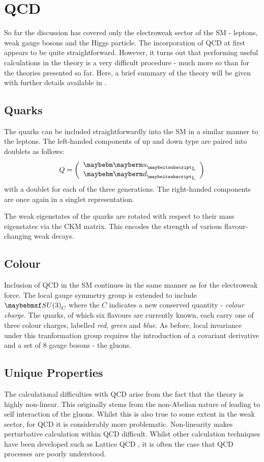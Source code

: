 \section{\acl{QCD}}
So far the discussion has covered only the electroweak sector of the \ac{SM} -
leptons, weak gauge bosons and the Higgs particle. The incorporation of
\acl{QCD} at first appears to be quite straightforward. However, it turns out
that performing useful calculations in the theory is a very difficult procedure
- much more so than for the theories presented so far. Here, a brief summary of
the theory will be given with further details available in \cite{pink_book}.

\subsection{Quarks}
The quarks can be included straightforwardly into the \ac{SM} in a similar
manner to the leptons. The left-handed components of up and down type are paired
into doublets as follows:
\begin{equation}
Q=\left(\begin{array}{c}\Pup_{\textrm{L}} \\ \Pdown_{\textrm{L}}\end{array}\right)
\end{equation}
with a doublet for each of the three generations. The right-handed components
are once again in a singlet representation.

The weak eigenstates of the quarks are rotated with respect to their mass
eigenstates via the \ac{CKM} matrix. This encodes the strength of various
flavour-changing weak decays.

\subsection{Colour}
Inclusion of \ac{QCD} in the \ac{SM} continues in the same manner as for the
electroweak force. The local gauge symmetry group is extended to include
$\SUthree_{C}$ where the $C$ indicates a new conserved quantity - \emph{colour
  charge}. The quarks, of which six flavours are currently known, each carry one
of three colour charges, labelled \emph{red}, \emph{green} and \emph{blue}. As
before, local invariance under this tranformation group requires the
introduction of a covariant derivative and a set of 8 gauge bosons - the gluons.

\subsection{Unique Properties}
The calculational difficulties with \ac{QCD} arise from the fact that the theory
is highly non-linear. This originally stems from the non-Abelian nature of
\SUthree leading to self interaction of the gluons. Whilst this is also true to
some extent in the weak sector, for \ac{QCD} it is considerably more
problematic. Non-linearity makes perturbative calculation within \ac{QCD}
difficult. Whilst other calculation techniques have been developed such as
Lattice \ac{QCD} \cite{lattice_qcd}, it is often the case that \ac{QCD}
processes are poorly understood.

